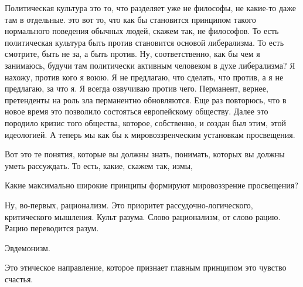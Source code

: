 Политическая культура это то, что разделяет уже не философы, не какие-то даже
там в отдельные. это вот то, что как бы становится принципом такого нормального
поведения обычных людей, скажем так, не философов. То есть политическая культура
быть против становится основой либерализма. То есть смотрите, быть не за, а быть
против. Ну, соответственно, как бы чем я занимаюсь, будучи там политически
активным человеком в духе либерализма? Я нахожу, против кого я воюю. Я не
предлагаю, что сделать, что против, а я не предлагаю, за что я. Я всегда
озвучиваю против чего. Перманент, вернее, претенденты на роль зла перманентно
обновляются. Еще раз повторюсь, что в новое время это позволило состояться
европейскому обществу. Далее это породило кризис того общества, которое,
собственно, и создан был этим, этой идеологией. А теперь мы как бы к
мировоззренческим установкам просвещения.

Вот это те понятия, которые вы должны
знать, понимать, которых вы должны уметь рассуждать. То есть, какие, скажем так,
измы, 

Какие максимально широкие принципы формируют мировоззрение просвещения?

Ну, во-первых, рационализм. Это приоритет рассудочно-логического, критического мышления.
Культ разума. Слово рационализм, от слово рацию. Рацию переводится разум.


Эвдемонизм. 

Это этическое направление, которое признает главным принципом это чувство счастья.

